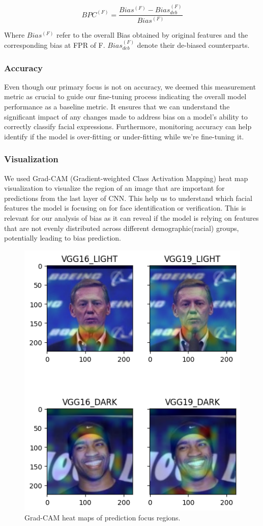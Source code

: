 \documentclass[conference]{IEEEtran}
\begin{document}
\begin{equation}
    {BPC^{(F)}=\frac{Bias^{(F)}-Bias_{deb}^{(F)}}{Bias^{(F)}}}
\end{equation}

Where $Bias^{(F)}$ refer to the overall Bias obtained by original features and the corresponding bias at FPR of F. $Bias_{deb}^{(F)}$ denote their de-biased counterparts. 

\subsubsection{Accuracy}
Even though our primary focus is not on accuracy, we deemed this measurement metric as crucial to guide our fine-tuning process indicating the overall model performance as a baseline metric. It ensures that we can understand the significant impact of any changes made to address bias on a model's ability to correctly classify facial expressions.
Furthermore, monitoring accuracy can help identify if the model is over-fitting or under-fitting while we’re fine-tuning it.

\subsubsection{Visualization}
We used Grad-CAM (Gradient-weighted Class Activation Mapping) heat map visualization to visualize the region of an image that are important for predictions from the last layer of CNN. This help us to understand which facial features the model is focusing on for face identification or verification. This is relevant for our analysis of bias as it can reveal if the model is relying on features that are not evenly distributed across different demographic(racial) groups, potentially leading to bias prediction.

\begin{figure}
    \centerline{\includegraphics[width=0.8\linewidth]{latex/images/heatmap.png}}
    \caption{Grad-CAM heat maps of prediction focus regions.}
    \label{grad_cam}
\end{figure}
\end{document}
